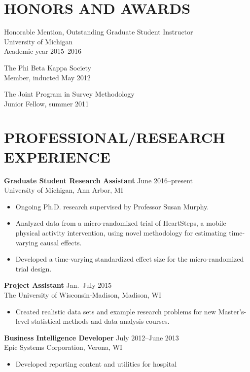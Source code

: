 \documentclass[line]{res}
\begin{document}
\begin{resume}
\section{HONORS AND AWARDS}          
Honorable Mention, Outstanding Graduate Student Instructor\\
University of Michigan\\
Academic year 2015--2016

The Phi Beta Kappa Society\\
Member, inducted May 2012

The Joint Program in Survey Methodology\\
Junior Fellow, summer 2011
\section{PROFESSIONAL/RESEARCH EXPERIENCE}
{\bf Graduate Student Research Assistant} \hfill June 2016--present\\
University of Michigan, Ann Arbor, MI
\begin{itemize}
\item Ongoing Ph.D. research supervised by Professor Susan Murphy.
\item Analyzed data from a micro-randomized trial of HeartSteps, a mobile physical activity intervention, using novel methodology for estimating time-varying causal effects.
\item Developed a time-varying standardized effect size for the micro-randomized trial design. 
\end{itemize}
{\bf Project Assistant} \hfill Jan.--July 2015\\
The University of Wisconsin-Madison, Madison, WI
\begin{itemize}
\item Created realistic data sets and example research problems for new Master's-level
  statistical methods and data analysis courses.
\end{itemize}
{\bf Business Intelligence Developer} \hfill July 2012--June
2013\\
Epic Systems Corporation, Verona, WI
\begin{itemize}
\item  Developed reporting content and utilities for hospital

\end{itemize}
\end{resume}
\end{document}
